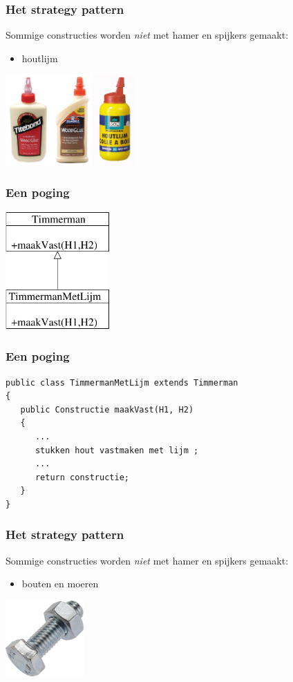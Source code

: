 \documentclass{beamer}
\begin{document}
\begin{frame}
\frametitle{Het strategy pattern}
Sommige constructies worden \emph{niet} met hamer en spijkers gemaakt:
\begin{itemize}
\item houtlijm
\end{itemize}
\begin{center}
\includegraphics[width=5cm]{houtlijm}
\end{center}
\end{frame}

\begin{frame}
\frametitle{Een poging}
\begin{center}
\includegraphics[width=4cm]{timmer2}
\end{center}
\end{frame}


\begin{frame}[fragile]
\frametitle{Een poging}
\begin{verbatim}
public class TimmermanMetLijm extends Timmerman
{
   public Constructie maakVast(H1, H2)
   {
      ...
      stukken hout vastmaken met lijm ;
      ...
      return constructie;
   }
}
\end{verbatim}
\end{frame}
\begin{frame}
\frametitle{Het strategy pattern}
Sommige constructies worden \emph{niet} met hamer en spijkers gemaakt:
\begin{itemize}
\item bouten en moeren
\end{itemize}
\begin{center}
\includegraphics[width=3cm]{bout}
\end{center}
\end{frame}
\end{document}
